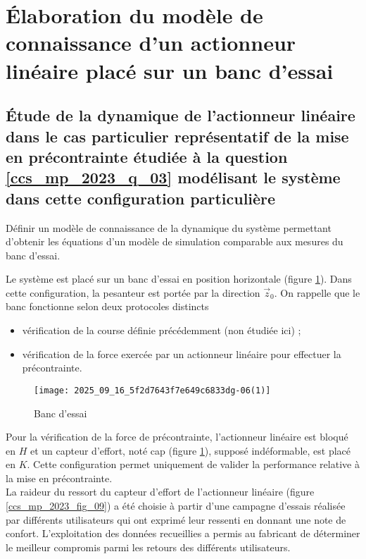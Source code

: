 
\section{Élaboration du modèle de connaissance d'un actionneur linéaire placé sur un banc d'essai}%
\subsection{Étude de la dynamique de l'actionneur linéaire dans le cas particulier représentatif de la mise en précontrainte étudiée à la question \ref{ccs_mp_2023_q_03} modélisant le système dans cette configuration particulière}

\begin{obj}
Définir un modèle de connaissance de la dynamique du système permettant d'obtenir les équations d'un modèle de simulation comparable aux mesures du banc d'essai.
\end{obj}

Le système est placé sur un banc d'essai en position horizontale (figure \ref{ccs_mp_2023_fig_08}). Dans cette configuration, la pesanteur est portée par la direction $\vec{z}_{0}$. On rappelle que le banc fonctionne selon deux protocoles distincts

\begin{itemize}
  \item vérification de la course définie précédemment (non étudiée ici) ;
  \item vérification de la force exercée par un actionneur linéaire pour effectuer la précontrainte.
\end{itemize}



\begin{figure}[!h]
\centering
\texttt{[image: 2025\_09\_16\_5f2d7643f7e649c6833dg-06(1)]}
\caption{\label{ccs_mp_2023_fig_08}  Banc d'essai}
\end{figure}



Pour la vérification de la force de précontrainte, l'actionneur linéaire est bloqué en $H$ et un capteur d'effort, noté cap (figure \ref{ccs_mp_2023_fig_08}), supposé indéformable, est placé en $K$. Cette configuration permet uniquement de valider la performance relative à la mise en précontrainte.\\
La raideur du ressort du capteur d'effort de l'actionneur linéaire (figure \ref{ccs_mp_2023_fig_09}) a été choisie à partir d'une campagne d'essais réalisée par différents utilisateurs qui ont exprimé leur ressenti en donnant une note de confort. L'exploitation des données recueillies a permis au fabricant de déterminer le meilleur compromis parmi les retours des différents utilisateurs.

